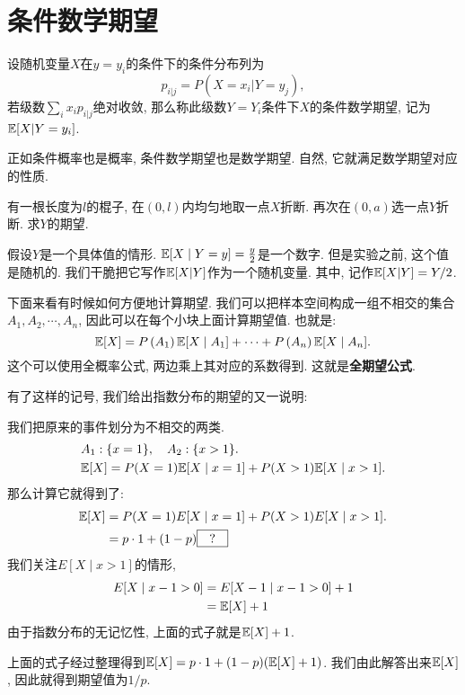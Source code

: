 \section{条件数学期望}



    \begin{definition}
        设随机变量$X$在$y=y_i$的条件下的条件分布列为
        $$
        p_{i|j}=P(X=x_i | Y=y_j),
        $$
        若级数$\sum_i x_i p_{i|j}$绝对收敛, 那么称此级数$Y=Y_i$条件下$X$的条件数学期望, 记为$\mathbb E[X|Y=y_i]$.
    \end{definition}

    正如条件概率也是概率, 条件数学期望也是数学期望. 自然, 它就满足数学期望对应的性质. 

    \begin{example}
        有一根长度为$l$的棍子, 在$(0,l)$内均匀地取一点$X$折断. 再次在$(0,a)$选一点$Y$折断. 求$Y$的期望. 
    \end{example}

    \begin{solution}
        假设$Y$是一个具体值的情形. $\mathbb E[X \mid Y=y]=\frac{y}{2}$是一个数字. 但是实验之前, 这个值是随机的. 我们干脆把它写作$\mathbb E[X|Y]$作为一个随机变量. 其中, 记作$\mathbb E[X|Y]=Y/2$.
    \end{solution}



    下面来看有时候如何方便地计算期望. 我们可以把样本空间构成一组不相交的集合$A_1, A_2, \cdots, A_n$, 因此可以在每个小块上面计算期望值. 也就是: $$
    \mathbb E[X]=P\left(A_1\right) \mathbb E[X \mid A_1]+\cdots+P\left(A_n\right) \mathbb E[X \mid A_n] .
    $$
    这个可以使用全概率公式, 两边乘上其对应的系数得到. 这就是\textbf{全期望公式}. 


    有了这样的记号, 我们给出指数分布的期望的又一说明: 
    \begin{example}
        
    我们把原来的事件划分为不相交的两类. 
    $$
    \begin{aligned}
    & A_1:\{x=1\}, \quad A_2:\{x>1\} . \\
    & \mathbb E[X]=P(X=1) \mathbb E[X \mid x=1]+P(X>1) \mathbb E[X \mid x>1] .
    \end{aligned}
    $$
    那么计算它就得到了: 
    $$
\begin{aligned}
\mathbb E[X] & =P(X=1) E[X \mid x=1]+P(X>1) E[X \mid x>1] . \\
& =p \cdot 1+(1-p)\boxed{~~?~~}
\end{aligned}
$$
我们关注$E[X \mid x>1]$的情形, $$
\begin{aligned}
E[X \mid x-1>0] & =E[X-1 \mid x-1>0]+1 \\
& =\mathbb E[X]+1
\end{aligned}
$$
由于指数分布的无记忆性, 上面的式子就是$\mathbb E[X]+1$. 

上面的式子经过整理得到$\mathbb E[X]=p \cdot 1+(1-p)(\mathbb E[X]+1)$. 我们由此解答出来$\mathbb E[X]$, 因此就得到期望值为$1/p$. 

    \end{example}

